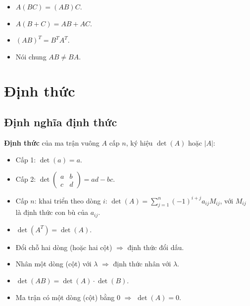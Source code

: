 \documentclass[12pt,a4paper]{article}
\begin{document}
\begin{tinhchat}
  \begin{itemize}
    \item $A(BC) = (AB)C$.
    \item $A(B + C) = AB + AC$.
    \item $(AB)^T = B^T A^T$.
    \item Nói chung $AB \ne BA$.
  \end{itemize}
\end{tinhchat}

\section{Định thức}

\subsection{Định nghĩa định thức}

\begin{dinhnghia}
  \textbf{Định thức} của ma trận vuông $A$ cấp $n$, ký hiệu $\det(A)$ hoặc $|A|$:
  \begin{itemize}
    \item Cấp 1: $\det(a) = a$.
    \item Cấp 2: $\det\begin{pmatrix} a & b \\ c & d \end{pmatrix} = ad - bc$.
    \item Cấp $n$: khai triển theo dòng $i$: $\det(A) = \sum_{j=1}^{n} (-1)^{i+j} a_{ij} M_{ij}$, với $M_{ij}$ là định thức con bù của $a_{ij}$.
  \end{itemize}
\end{dinhnghia}

\begin{dinhly}[title={Tính chất định thức}]
  \begin{itemize}
    \item $\det(A^T) = \det(A)$.
    \item Đổi chỗ hai dòng (hoặc hai cột) $\Rightarrow$ định thức đổi dấu.
    \item Nhân một dòng (cột) với $\lambda$ $\Rightarrow$ định thức nhân với $\lambda$.
    \item $\det(AB) = \det(A) \cdot \det(B)$.
    \item Ma trận có một dòng (cột) bằng 0 $\Rightarrow$ $\det(A) = 0$.
  \end{itemize}
\end{dinhly}
\end{document}
